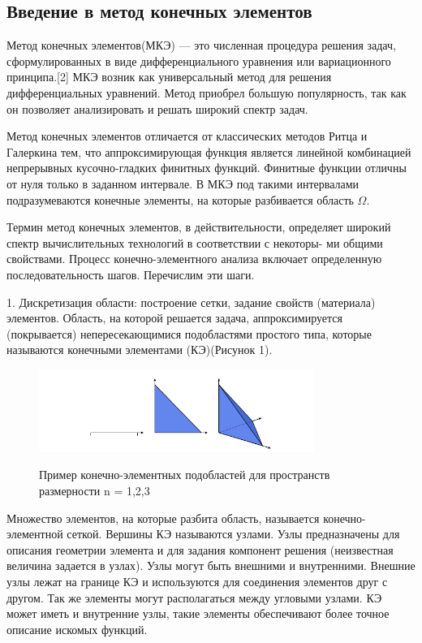 \subsection{Введение в метод конечных элементов}

Метод конечных элементов(МКЭ) — это численная процедура решения задач,
сформулированных в виде дифференциального уравнения или вариационного 
принципа.[2]
МКЭ возник как универсальный метод для решения дифференциальных уравнений. 
Метод приобрел большую популярность, так как он позволяет анализировать и
решать широкий спектр задач.


Метод конечных элементов отличается от классических
методов Ритца и Галеркина тем, что аппроксимирующая функция является
линейной комбинацией непрерывных кусочно-гладких финитных функций.
Финитные функции отличны от нуля только в заданном интервале.
В МКЭ под такими интервалами подразумеваются конечные элементы, на
которые разбивается область $\Omega$. 


Термин метод конечных элементов, в действительности, определяет
широкий спектр вычислительных технологий в соответствии с некоторы-
ми общими свойствами. Процесс конечно-элементного анализа включает
определенную последовательность шагов. Перечислим эти шаги.

1. Дискретизация области: построение сетки, задание свойств (материала)
элементов. Область, на которой решается задача, аппроксимируется
(покрывается) непересекающимися подобластями простого типа, которые
называются конечными элементами (КЭ)(Рисунок 1).

\renewcommand{\figurename}{Рисунок}
\begin{figure}[H]
      \centering
      \includegraphics[width=0.8\textwidth]{./pics/random-cells.png}\\
      \centering\caption{Пример конечно-элементных подобластей для пространств размерности n = 1,2,3}
\end{figure}
Множество элементов, на которые разбита область, называется конечно-элементной сеткой. Вершины КЭ
называются узлами. Узлы предназначены для описания геометрии элемента
и для задания компонент решения (неизвестная величина задается в узлах).
Узлы могут быть внешними и внутренними. Внешние узлы лежат на границе КЭ и используются для соединения элементов друг с другом. Так же элементы могут располагаться между угловыми узлами.
КЭ может иметь и внутренние узлы, такие элементы обеспечивают более точное описание
искомых функций. 

